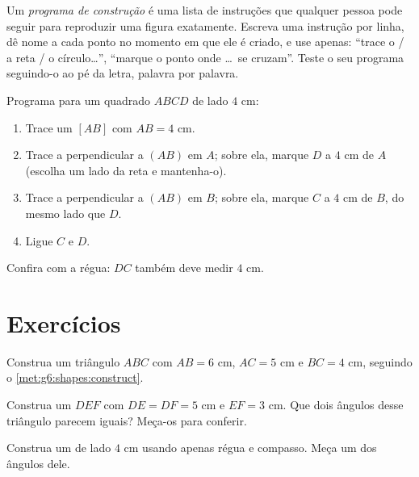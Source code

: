 \begin{method}\label{met:g6:shapes:program}
Um \emph{programa de construção} é uma lista de instruções que qualquer
pessoa pode seguir para reproduzir uma figura exatamente. Escreva uma
instrução por linha, dê nome a cada ponto no momento em que ele é
criado, e use apenas: ``trace o  / a reta / o círculo\dots'',
``marque o ponto onde \dots\ se cruzam''. Teste o seu programa
seguindo-o ao pé da letra, palavra por palavra.
\end{method}

\begin{example}\label{ex:g6:shapes:program}
Programa para um quadrado $ABCD$ de lado $4$ cm:
\begin{enumerate}
  \item Trace um  $[AB]$ com $AB = 4$ cm.
  \item Trace a perpendicular a $(AB)$ em $A$; sobre ela, marque $D$ a
        $4$ cm de $A$ (escolha um lado da reta e mantenha-o).
  \item Trace a perpendicular a $(AB)$ em $B$; sobre ela, marque $C$ a
        $4$ cm de $B$, do mesmo lado que $D$.
  \item Ligue $C$ e $D$.
\end{enumerate}
Confira com a régua: $DC$ também deve medir $4$ cm.
\end{example}

\section{Exercícios}

\begin{exercise}[$\star$]\label{exo:g6:shapes:1}
Construa um triângulo $ABC$ com $AB = 6$ cm, $AC = 5$ cm e
$BC = 4$ cm, seguindo o \cref{met:g6:shapes:construct}.
\end{exercise}

\begin{exercise}[$\star$]\label{exo:g6:shapes:2}
Construa um  $DEF$ com $DE = DF = 5$ cm e
$EF = 3$ cm. Que dois ângulos desse triângulo parecem iguais? Meça-os
para conferir.
\end{exercise}

\begin{exercise}[$\star$]\label{exo:g6:shapes:3}
Construa um  de lado $4$ cm usando apenas régua e
compasso. Meça um dos ângulos dele.
\end{exercise}


